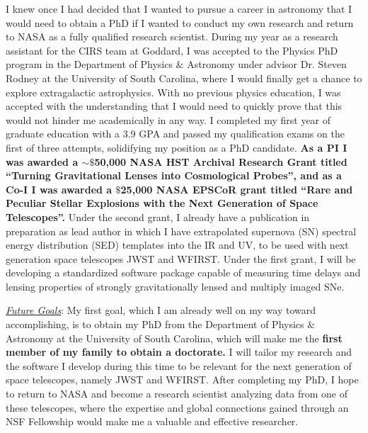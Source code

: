 I  knew once  I  had decided  that  I  wanted to  pursue  a career  in
astronomy that I would need to obtain  a PhD if I wanted to conduct my
own  research  and  return  to  NASA as  a  fully  qualified  research
scientist.  During my  year as a research assistant for  the CIRS team
at  Goddard,  I  was  accepted  to the  Physics  PhD  program  in  the
Department of Physics $\&$ Astronomy  under advisor Dr.  Steven Rodney
at  the  University  of  South  Carolina, where  I would finally get a chance to explore extragalactic astrophysics.  With no previous physics education,
I was  accepted with the  understanding that  I would need  to quickly
prove  that this  would  not hinder  me academically  in  any way.   I
completed  my first  year of  graduate education  with a  3.9 GPA  and
passed  my  qualification  exams  on  the  first  of  three  attempts,
solidifying  my position  as  a PhD  candidate. \textbf{As a PI  I was  awarded
a $\sim\$$50,000  NASA HST Archival Research  Grant titled ``Turning
Gravitational  Lenses into  Cosmological Probes'',  and as a Co-I I  was
awarded  a $\$$25,000  NASA  EPSCoR grant  titled  ``Rare and  Peculiar
Stellar    Explosions   with    the   Next    Generation   of    Space
Telescopes''.} Under the second  grant, I already have  a publication in
preparation as lead author in which I have extrapolated supernova (SN)
spectral energy distribution (SED) templates into the IR and UV, to be
used with next generation space telescopes JWST and WFIRST.  Under the
first grant,  I will  be developing  a standardized  software package
capable of  measuring time delays  and lensing properties  of strongly
gravitationally lensed and multiply imaged SNe.

\underline{\textit{Future Goals}}:
My first goal, which I am already well on my way toward accomplishing,
is to obtain  my PhD from the Department of  Physics $\&$ Astronomy at
the University of South Carolina, which  will make me the \textbf{first member
of my family  to obtain a doctorate.} I will tailor  my research and
the software  I develop during this  time to be relevant  for the next
generation  of  space  telescopes,  namely  JWST  and  WFIRST.   After
completing my  PhD, I hope to  return to NASA  and become  a research
scientist  analyzing data  from  one of  these  telescopes, where  the
expertise  and global  connections  gained through  an NSF  Fellowship
would make me a valuable and effective researcher.

